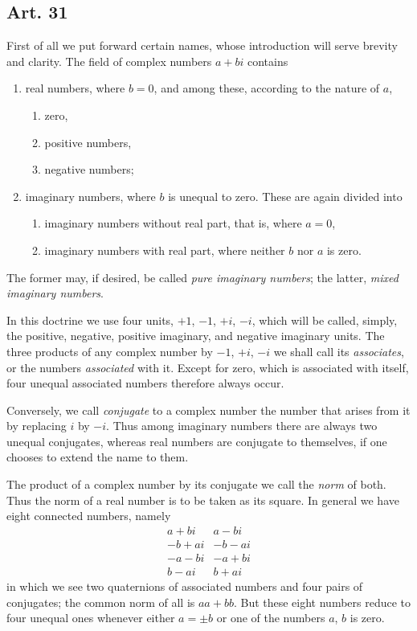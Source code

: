 \documentclass[12pt]{article}
\newcommand{\art}[1]{\subsection*{Art. #1}}
\begin{document}
\art{31}

First of all we put forward certain names, whose introduction will serve brevity and clarity. The field of complex numbers $a+bi$ contains

\begin{enumerate}[label=\Roman*.]
\item real numbers, where $b=0$, and among these, according to the nature of $a$,
    \begin{enumerate}[label=\arabic*)]
    \item zero,
    \item positive numbers,
    \item negative numbers;
    \end{enumerate}
\item imaginary numbers, where $b$ is unequal to zero. These are again divided into
    \begin{enumerate}[label=\arabic*)]
    \item imaginary numbers without real part, that is, where $a=0$,
    \item imaginary numbers with real part, where neither $b$ nor $a$ is zero.
    \end{enumerate}
\end{enumerate}

The former may, if desired, be called \textit{pure imaginary numbers}; the latter, \textit{mixed imaginary numbers}.

In this doctrine we use four units, $+1$, $-1$, $+i$, $-i$, which will be called, simply, the positive, negative, positive imaginary, and negative imaginary units. The three products of any complex number by $-1$, $+i$, $-i$ we shall call its \textit{associates}, or the numbers \textit{associated} with it. Except for zero, which is associated with itself, four unequal associated numbers therefore always occur.

Conversely, we call \textit{conjugate} to a complex number the number that arises from it by replacing $i$ by $-i$. Thus among imaginary numbers there are always two unequal conjugates, whereas real numbers are conjugate to themselves, if one chooses to extend the name to them.

The product of a complex number by its conjugate we call the \textit{norm} of both. Thus the norm of a real number is to be taken as its square. In general we have eight connected numbers, namely
\[
\begin{array}{r|r}
 a+bi & a-bi\\
 -b+ai & -b-ai\\
 -a-bi & -a+bi\\
 b-ai & b+ai
\end{array}
\]
in which we see two quaternions of associated numbers and four pairs of conjugates; the common norm of all is $aa+bb$. But these eight numbers reduce to four unequal ones whenever either $a=\pm b$ or one of the numbers $a$, $b$ is zero.
\end{document}
